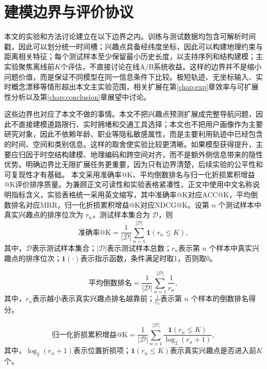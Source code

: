 \section{建模边界与评价协议}
本文的实验和方法讨论建立在以下边界之内。训练与测试数据均包含可解析时间戳，因此可以划分统一时间槽；兴趣点具备经纬度坐标，因此可以构建地理约束与距离相关特征；每个测试样本至少保留最小历史长度，以支持序列和结构建模；主实验聚焦离线前$K$个评估，不直接讨论在线A/B系统收益。这样的边界并不是缩小问题价值，而是保证不同模型在同一信息条件下比较。极短轨迹、无坐标输入、实时概念漂移等情形超出本文主实验范围，相关扩展在第\ref{chap:exp}章效率与可扩展性分析以及第\ref{chap:conclusion}章展望中讨论。

这些边界也对应了本文不做的事情。本文不把兴趣点预测扩展成完整导航问题，因此不直接建模道路限行、实时拥堵和交通工具选择；本文也不把用户画像作为主要研究对象，因此不依赖年龄、职业等隐私敏感属性，而是主要利用轨迹中已经包含的时间、空间和类别信息。这样的取舍使实验比较更清晰。如果模型获得提升，主要应归因于时空结构建模、地理编码和跨空间对齐，而不是额外侧信息带来的隐性优势。明确边界比无限扩展任务更重要，因为只有边界清楚，后续实验的公平性和可复现性才有基础。
本文采用准确率@K、平均倒数排名与归一化折损累积增益@K评价排序质量。为兼顾正文可读性和实验表格紧凑性，正文中使用中文名称说明指标含义，实验表格统一采用英文缩写，其中准确率@K对应ACC@K，平均倒数排名对应MRR，归一化折损累积增益@K对应NDCG@K。设第 $n$ 个测试样本中真实兴趣点的排序位次为 $r_n$，测试样本集合为 $\mathcal{D}$，则
\begin{equation}
\text{准确率@K}=\frac{1}{|\mathcal{D}|}\sum_{n=1}^{|\mathcal{D}|}\mathbf{1}(r_n\le K),
\label{eq:c2-acc}
\end{equation}
其中，$\mathcal{D}$表示测试样本集合；$|\mathcal{D}|$表示测试样本总数；$r_n$表示第 $n$ 个样本中真实兴趣点的排序位次；$\mathbf{1}(\cdot)$表示指示函数，条件满足时取1，否则取0。

\begin{equation}
\text{平均倒数排名}=\frac{1}{|\mathcal{D}|}\sum_{n=1}^{|\mathcal{D}|}\frac{1}{r_n},
\label{eq:c2-mrr}
\end{equation}
其中，$r_n$表示越小表示真实兴趣点排名越靠前；$\frac{1}{r_n}$表示第 $n$ 个样本的倒数排名得分。

\begin{equation}
\text{归一化折损累积增益@K}=\frac{1}{|\mathcal{D}|}\sum_{n=1}^{|\mathcal{D}|}\frac{\mathbf{1}(r_n\le K)}{\log_2(r_n+1)},
\label{eq:c2-ndcg}
\end{equation}
其中，$\log_2(r_n+1)$表示位置折损项；$\mathbf{1}(r_n\le K)$表示真实兴趣点是否进入前$K$个。

